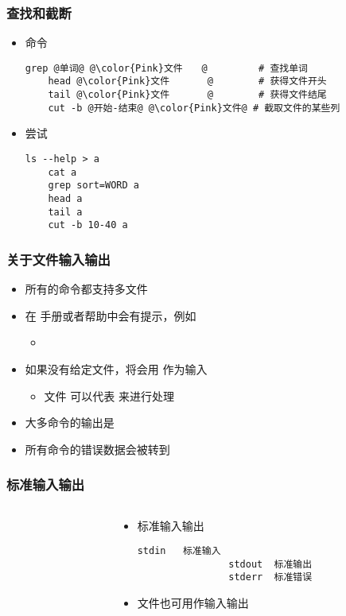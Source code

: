 \begin{CJK}{UTF8}{gbsn}
\begin{frame} [fragile]
	\frametitle{查找和截断}
	\linespread{1.25}
	\begin{itemize}
	\item 命令
	\begin{lstlisting}[style=bashstyle, gobble=4, texcl, escapechar=@]
	grep @单词@ @\color{Pink}文件　　@		 # 查找单词
	head @\color{Pink}文件　　　　@		 # 获得文件开头
	tail @\color{Pink}文件　　　　@		 # 获得文件结尾
	cut -b @开始-结束@ @\color{Pink}文件@	# 截取文件的某些列
	\end{lstlisting}
	\item 尝试
	\begin{lstlisting}[style=bashstyle, gobble=4, texcl, escapechar=@]
	ls --help > a
	cat a
	grep sort=WORD a
	head a
	tail a
	cut -b 10-40 a
	\end{lstlisting}
	\end{itemize}
\end{frame}

\begin{frame} [fragile]
	\frametitle{关于文件输入输出}
	\linespread{1.5}
	\begin{itemize}
	\item 所有的命令都支持多文件
	\item 在  手册或者帮助中会有提示，例如
		\begin{itemize}
		\item {}
		\end{itemize}
	\item 如果没有给定文件，将会用  作为输入
		\begin{itemize}
		\item 文件 \inlineBash{-} 可以代表  来进行处理
		\end{itemize}
	\item 大多命令的输出是 
	\item 所有命令的错误数据会被转到 
	\end{itemize}
\end{frame}

\begin{frame} [fragile]
	\frametitle{标准输入输出}
	\linespread{1.25}
	\begin{columns}[T]
		\begin{column}[T]{.5\textwidth}
			
		\end{column}
		\begin{column}[T]{.5\textwidth}
			\begin{itemize}
			\item 标准输入输出
				\begin{lstlisting}[style=bashstyle, gobble=16, texcl]
				stdin	标准输入
				stdout	标准输出
				stderr	标准错误
				\end{lstlisting}
			\item 文件也可用作输入输出
			\end{itemize}
		\end{column}
	\end{columns}
\end{frame}


\end{CJK}
